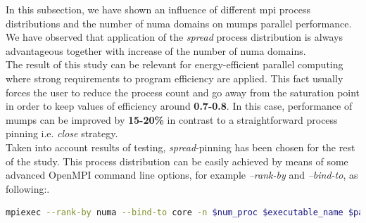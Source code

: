 
In this subsection, we have shown an influence of different \acrshort{mpi} process distributions and the number of \acrshort{numa} domains on \acrshort{mumps} parallel performance. We have observed that application of the  \textit{spread} process distribution is always advantageous together with increase of the number of \acrshort{numa} domains.\\ 


The result of this study can be relevant for energy-efficient parallel computing where strong requirements to program efficiency are applied. This fact usually forces the user to reduce the process count and go away from the saturation point in order to keep values of efficiency around \textbf{0.7-0.8}. In this case, performance of \acrshort{mumps} can be improved by \textbf{15-20\%} in contrast to a straightforward process pinning i.e. \textit{close} strategy.\\


Taken into account results of testing, \textit{spread}-pinning has been chosen for the rest of the study. This process distribution can be easily achieved by means of some advanced OpenMPI command line options, for example \textit{--rank-by} and \textit{--bind-to}, as following:. \\

\begin{lstlisting}[language=bash, mathescape=false, caption={An example of setting \textit{spread} process pinning using  advanced OpenMPI command line options}, frame=single, label={lst:iterative-refinement}]
mpiexec --rank-by numa --bind-to core -n $num_proc $executable_name $parameters
\end{lstlisting}

